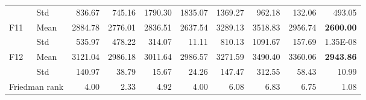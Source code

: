 \begin{tabular}{@{}llrrrrrrrr@{}}
 & Std & 836.67 & 745.16 & 1790.30 & 1835.07 & 1369.27 & 962.18 & 132.06 & 493.05 \\
F11 & Mean & 2884.78 & 2776.01 & 2836.51 & 2637.54 & 3289.13 & 3518.83 & 2956.74 & \textbf{2600.00} \\
 & Std & 535.97 & 478.22 & 314.07 & 11.11 & 810.13 & 1091.67 & 157.69 & 1.35E-08 \\
F12 & Mean & 3121.04 & 2986.18 & 3011.64 & 2986.57 & 3271.59 & 3490.40 & 3360.06 & \textbf{2943.86} \\
 & Std & 140.97 & 38.79 & 15.67 & 24.26 & 147.47 & 312.55 & 58.43 & 10.99 \\
\midrule
\multicolumn{2}{l}{Friedman rank} & 4.00 & 2.33 & 4.92 & 4.00 & 6.08 & 6.83 & 6.75 & 1.08 \\
\bottomrule
\end{tabular}

